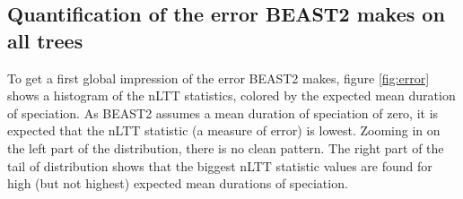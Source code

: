 
%  




\subsection{Quantification of the error BEAST2 makes on all trees}

To get a first global impression of the error BEAST2 makes, figure \ref{fig:error}
shows a histogram of the nLTT statistics, colored by the expected mean
duration of speciation. As BEAST2 assumes a mean duration of speciation of zero,
it is expected that the nLTT statistic (a measure of error) is lowest. Zooming
in on the left part of the distribution, there is no clean pattern.
The right part of the tail of distribution shows that the biggest nLTT
statistic values are found for high (but not highest) expected mean durations of
speciation.


%  

